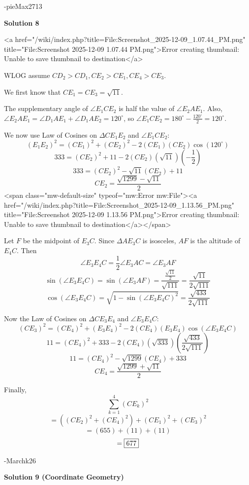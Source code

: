 \begin{enumerate}
 -pieMax2713

 



\textbf{Solution 8}

<a href="/wiki/index.php?title=File:Screenshot\_2025-12-09\_1.07.44\_PM.png" title="File:Screenshot 2025-12-09 1.07.44 PM.png">Error creating thumbnail: Unable to save thumbnail to destination</a>

 WLOG assume $CD_2>CD_1, CE_2>CE_1, CE_4>CE_3$.

 We first know that $CE_1=CE_3=\sqrt{11}$.

 The supplementary angle of $\angle E_1CE_2$ is half the value of $\angle E_2AE_1$. Also, $\angle E_2AE_1=\angle D_1AE_1 + \angle D_1AE_2 = 120^{\circ}$, so $\angle E_1CE_2=180^{\circ}-\frac{120^{\circ}}{2}=120^{\circ}$.

 We now use Law of Cosines on $\Delta CE_1E_2$ and $\angle E_1CE_2$:
 \[(E_1E_2)^2=(CE_1)^2+(CE_2)^2-2(CE_1)(CE_2)\cos(120^{\circ})\]
 \[333=(CE_2)^2+11-2(CE_2)(\sqrt{11})(-\frac{1}{2})\]
 \[333=(CE_2)^2-\sqrt{11}(CE_2)+11\]
 \[CE_2=\frac{\sqrt{1299}-\sqrt{11}}{2}\]
<span class="mw-default-size" typeof="mw:Error mw:File"><a href="/wiki/index.php?title=File:Screenshot\_2025-12-09\_1.13.56\_PM.png" title="File:Screenshot 2025-12-09 1.13.56 PM.png">Error creating thumbnail: Unable to save thumbnail to destination</a></span>

 Let $F$ be the midpoint of $E_3C$. Since $\Delta AE_3C$ is isosceles, $AF$ is the altitude of $E_4C$. Then
 \[\angle E_3E_4C=\frac{1}{2}\angle E_3AC=\angle E_3AF\]
 \[\sin(\angle E_3E_4C)=\sin(\angle E_3AF)=\frac{\frac{\sqrt{11}}{2}}{\sqrt{111}}=\frac{\sqrt{11}}{2\sqrt{111}}\]
 \[\cos(\angle E_3E_4C)=\sqrt{1-\sin(\angle E_3E_4C)^2}=\frac{\sqrt{433}}{2\sqrt{111}}\]

 Now the Law of Cosines on $\Delta CE_3E_4$ and $\angle E_3E_4C$:
 \[(CE_3)^2=(CE_4)^2+(E_3E_4)^2-2(CE_4)(E_3E_4)\cos(\angle E_3E_4C)\]
 \[11=(CE_4)^2+333-2(CE_4)(\sqrt{333})(\frac{\sqrt{433}}{2\sqrt{111}})\]
 \[11=(CE_4)^2-\sqrt{1299}(CE_4)+333\]
 \[CE_4=\frac{\sqrt{1299}+\sqrt{11}}{2}\]

 Finally,
 \[\sum_{k=1}^4(CE_k)^2\]
 \[=((CE_2)^2+(CE_4)^2)+(CE_1)^2+(CE_3)^2\]
 \[=(655)+(11)+(11)\]
 \[=\framebox{677}\]

 -Marchk26

 



\textbf{Solution 9 (Coordinate Geometry)}


\end{enumerate}
